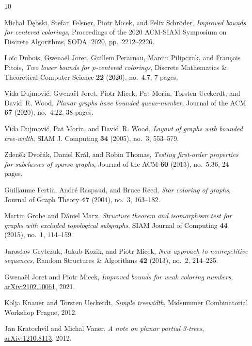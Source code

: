 \documentclass[11pt]{article}
\begin{document}
 
\begin{thebibliography}{10}

Michał D\k{e}bski, Stefan Felsner, Piotr Micek, and Felix Schröder,
  \emph{Improved bounds for centered colorings}, Proceedings of the 2020
  ACM-SIAM Symposium on Discrete Algorithms, SODA, 2020, pp.~2212--2226.

Loïc Dubois, Gwenaël Joret, Guillem Perarnau, Marcin Pilipczuk, and François
  Pitois, \emph{{Two lower bounds for $p$-centered colorings}}, {Discrete
  Mathematics \& Theoretical Computer Science} \textbf{22} (2020), no.~4.7, 7
  pages.

Vida Dujmovi\'{c}, Gwena\"{e}l Joret, Piotr Micek, Pat Morin, Torsten Ueckerdt,
  and David~R. Wood, \emph{Planar graphs have bounded queue-number}, Journal of
  the ACM \textbf{67} (2020), no.~4.22, 38 pages.

Vida Dujmovi\'{c}, Pat Morin, and David~R. Wood, \emph{Layout of graphs with
  bounded tree-width}, SIAM J. Computing \textbf{34} (2005), no.~3, 553--579.

Zden\v{e}k Dvo\v{r}\'{a}k, Daniel Kr\'{a}l, and Robin Thomas, \emph{Testing
  first-order properties for subclasses of sparse graphs}, Journal of the ACM
  \textbf{60} (2013), no.~5.36, 24 pages.

Guillaume Fertin, André Raspaud, and Bruce Reed, \emph{Star coloring of
  graphs}, Journal of Graph Theory \textbf{47} (2004), no.~3, 163--182.

Martin Grohe and D\'{a}niel Marx, \emph{Structure theorem and isomorphism test
  for graphs with excluded topological subgraphs}, SIAM Journal of Computing
  \textbf{44} (2015), no.~1, 114--159.

Jarosław Grytczuk, Jakub Kozik, and Piotr Micek, \emph{New approach to
  nonrepetitive sequences}, Random Structures \& Algorithms \textbf{42} (2013),
  no.~2, 214--225.

Gwena{\"{e}}l Joret and Piotr Micek, \emph{Improved bounds for weak coloring
  numbers}, \href{https://arxiv.org/abs/2102.10061}{arXiv:2102.10061}, 2021.

Kolja Knauer and Torsten Ueckerdt, \emph{Simple treewidth}, {M}idsummer
  {C}ombinatorial {W}orkshop {Prague}, 2012.

Jan Kratochv{\'{\i}}l and Michal Vaner, \emph{A note on planar partial
  3-trees}, \href{https://arxiv.org/abs/1210.8113}{arXiv:1210.8113}, 2012.


\end{thebibliography}
\end{document}
